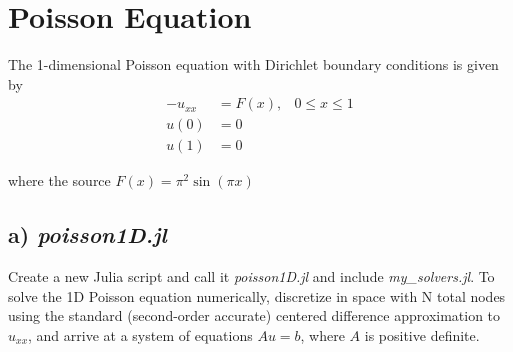 \documentclass{article}
\begin{document}
\section{Poisson Equation}
The 1-dimensional Poisson equation with Dirichlet boundary conditions is given
by
\begin{align*}
    -u_{xx} &= F(x), & 0 \leq x \leq 1\\
    u(0) &= 0\\
    u(1) &= 0
\end{align*}

where the source $F(x) = \pi^2 \sin(\pi x)$

\subsection{a) \textit{poisson1D.jl}}

Create a new Julia script and call it \textit{poisson1D.jl} and include
\textit{my\_solvers.jl}. To solve the 1D Poisson equation numerically,
discretize in space with N total nodes using the standard (second-order
accurate) centered difference approximation to $u_{xx}$, and arrive at a system of
equations $Au = b$, where $A$ is positive definite.
\end{document}
